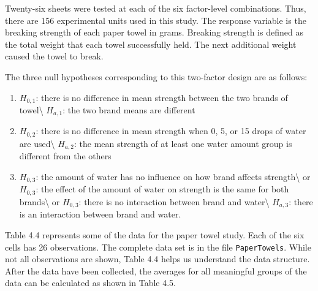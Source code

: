 \documentclass[
]{report}
\begin{document}
Twenty-six sheets were tested at each of the six factor-level combinations. Thus, there are 156 experimental units used in this study. The response variable is the breaking strength of each paper towel in grams. Breaking strength is defined as the total weight that each towel successfully held. The next additional weight caused the towel to break.

The three null hypotheses corresponding to this two-factor design are as follows:

\begin{enumerate}
\def\labelenumi{\arabic{enumi}.}
\item
  \(H_{0,1}\): there is no difference in mean strength between the two brands of towel\textbackslash{}
  \(H_{a,1}\): the two brand means are different
\item
  \(H_{0,2}\): there is no difference in mean strength when 0, 5, or 15 drops of water are used\textbackslash{}
  \(H_{a,2}\): the mean strength of at least one water amount group is different from the others
\item
  \(H_{0,3}\): the amount of water has no influence on how brand affects strength\textbackslash{}
  or \(H_{0,3}\): the effect of the amount of water on strength is the same for both brands\textbackslash{}
  or \(H_{0,3}\): there is no interaction between brand and water\textbackslash{}
  \(H_{a,3}\): there is an interaction between brand and water.
\end{enumerate}

Table 4.4 represents some of the data for the paper towel study. Each of the six cells has 26 observations. The complete data set is in the file \texttt{PaperTowels}. While not all observations are shown, Table 4.4 helps us understand the data structure. After the data have been collected, the averages for all meaningful groups of the data can be calculated as shown in Table 4.5.
\end{document}
